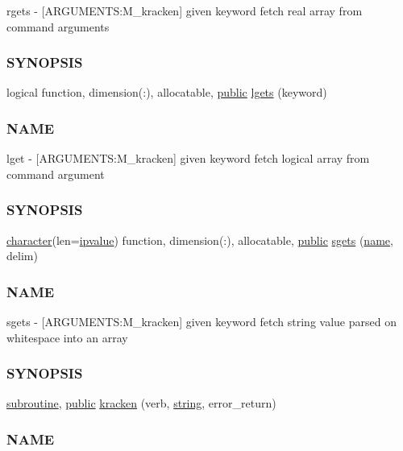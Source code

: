 \begin{DoxyCompactItemize}
\begin{DoxyCompactList}
rgets -\/ \mbox{[}A\+R\+G\+U\+M\+E\+N\+TS\+:M\+\_\+kracken\mbox{]} given keyword fetch real array from command arguments \subsubsection*{S\+Y\+N\+O\+P\+S\+IS}\end{DoxyCompactList}\item 
logical function, dimension(\+:), allocatable, \hyperlink{M__stopwatch_83_8txt_a2f74811300c361e53b430611a7d1769f}{public} \hyperlink{namespacem__kracken_afb3f3b45b78625758818ea9bef463fd9}{lgets} (keyword)
\begin{DoxyCompactList}\small\item\em \subsubsection*{N\+A\+ME}

lget -\/ \mbox{[}A\+R\+G\+U\+M\+E\+N\+TS\+:M\+\_\+kracken\mbox{]} given keyword fetch logical array from command argument \subsubsection*{S\+Y\+N\+O\+P\+S\+IS}\end{DoxyCompactList}\item 
\hyperlink{option__stopwatch_83_8txt_abd4b21fbbd175834027b5224bfe97e66}{character}(len=\hyperlink{namespacem__kracken_a9e71724677cede703e1fb186e446349f}{ipvalue}) function, dimension(\+:), allocatable, \hyperlink{M__stopwatch_83_8txt_a2f74811300c361e53b430611a7d1769f}{public} \hyperlink{namespacem__kracken_a8ae60c1a9c903c8ad06ef1f95975d457}{sgets} (\hyperlink{M__stopwatch_83_8txt_a3f508a893ae4c3b397b4383e33b9bcae}{name}, delim)
\begin{DoxyCompactList}\small\item\em \subsubsection*{N\+A\+ME}

sgets -\/ \mbox{[}A\+R\+G\+U\+M\+E\+N\+TS\+:M\+\_\+kracken\mbox{]} given keyword fetch string value parsed on whitespace into an array \subsubsection*{S\+Y\+N\+O\+P\+S\+IS}\end{DoxyCompactList}\item 
\hyperlink{M__stopwatch_83_8txt_acfbcff50169d691ff02d4a123ed70482}{subroutine}, \hyperlink{M__stopwatch_83_8txt_a2f74811300c361e53b430611a7d1769f}{public} \hyperlink{namespacem__kracken_a850dce381e1cfe18a4ebcaa214995e39}{kracken} (verb, \hyperlink{what__overview_81_8txt_a74cb7e955273b9f9157b4f0c18a38849}{string}, error\+\_\+return)
\begin{DoxyCompactList}\small\item\em \subsubsection*{N\+A\+ME}


\end{DoxyCompactList}
\end{DoxyCompactItemize}
